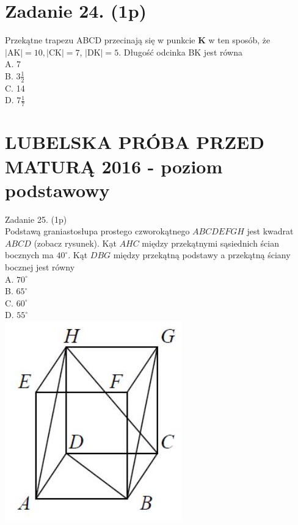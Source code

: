 \documentclass[10pt]{article}
\begin{document}
\section*{Zadanie 24. (1p)}
Przekątne trapezu ABCD przecinają się w punkcie \(\boldsymbol{K}\) w ten sposób, że \(|\mathrm{AK}|=10,|\mathrm{CK}|=7\), \(|\mathrm{DK}|=5\). Długość odcinka BK jest równa\\
A. 7\\
B. \(3 \frac{1}{2}\)\\
C. 14\\
D. \(7 \frac{1}{7}\)

\section*{LUBELSKA PRÓBA PRZED MATURĄ 2016 - poziom podstawowy}
Zadanie 25. (1p)\\
Podstawą graniastosłupa prostego czworokątnego \(A B C D E F G H\) jest kwadrat \(A B C D\) (zobacz rysunek). Kạt \(A H C\) między przekątnymi sąsiednich ścian bocznych ma \(40^{\circ}\). Kąt \(D B G\) między przekątną podstawy a przekątną ściany bocznej jest równy\\
A. \(70^{\circ}\)\\
B. \(65^{\circ}\)\\
C. \(60^{\circ}\)\\
D. \(55^{\circ}\)\\
\includegraphics[max width=\textwidth, center]{2024_11_21_0213a2175f3206eefc55g-07}
\end{document}
